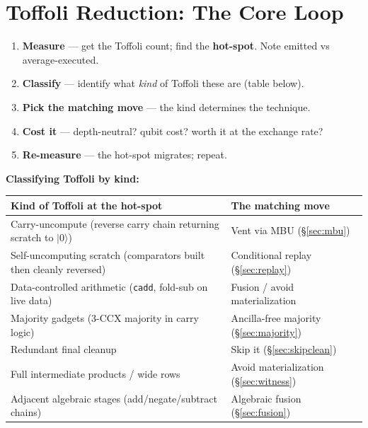 \documentclass[11pt,a4paper]{article}
\newcommand{\ket}[1]{$|#1\rangle$\xspace}
\newcommand{\tof}{Toffoli\xspace}
\begin{document}
\section{Toffoli Reduction: The Core Loop}
\label{sec:tofloop}

\begin{enumerate}
  \item \textbf{Measure} --- get the \tof count; find the \textbf{hot-spot}. Note emitted vs average-executed.
  \item \textbf{Classify} --- identify what \emph{kind} of Toffoli these are (table below).
  \item \textbf{Pick the matching move} --- the kind determines the technique.
  \item \textbf{Cost it} --- depth-neutral? qubit cost? worth it at the exchange rate?
  \item \textbf{Re-measure} --- the hot-spot migrates; repeat.
\end{enumerate}

\textbf{Classifying Toffoli by kind:}
\begin{center}
\begin{tabular}{p{6.5cm}p{6cm}}
\toprule
\textbf{Kind of Toffoli at the hot-spot} & \textbf{The matching move} \\
\midrule
Carry-uncompute (reverse carry chain returning scratch to \ket{0}) & Vent via MBU (\S\ref{sec:mbu}) \\
Self-uncomputing scratch (comparators built then cleanly reversed) & Conditional replay (\S\ref{sec:replay}) \\
Data-controlled arithmetic (\texttt{cadd}, fold-sub on live data) & Fusion / avoid materialization \\
Majority gadgets (3-CCX majority in carry logic) & Ancilla-free majority (\S\ref{sec:majority}) \\
Redundant final cleanup & Skip it (\S\ref{sec:skipclean}) \\
Full intermediate products / wide rows & Avoid materialization (\S\ref{sec:witness}) \\
Adjacent algebraic stages (add/negate/subtract chains) & Algebraic fusion (\S\ref{sec:fusion}) \\
\bottomrule
\end{tabular}
\end{center}
\end{document}
